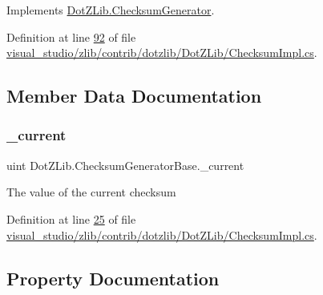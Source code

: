 Implements \hyperlink{interface_dot_z_lib_1_1_checksum_generator_ab894f35764ea30031c616517a6a00391}{Dot\+Z\+Lib.\+Checksum\+Generator}.



Definition at line \hyperlink{visual__studio_2zlib_2contrib_2dotzlib_2_dot_z_lib_2_checksum_impl_8cs_source_l00092}{92} of file \hyperlink{visual__studio_2zlib_2contrib_2dotzlib_2_dot_z_lib_2_checksum_impl_8cs_source}{visual\+\_\+studio/zlib/contrib/dotzlib/\+Dot\+Z\+Lib/\+Checksum\+Impl.\+cs}.



\subsection{Member Data Documentation}
\mbox{\label{class_dot_z_lib_1_1_checksum_generator_base_a081221e827dc7d3050fbdffc2973abea}} 
\subsubsection{\texorpdfstring{\+\_\+current}{\_current}}
{\footnotesize\ttfamily uint Dot\+Z\+Lib.\+Checksum\+Generator\+Base.\+\_\+current\hspace{0.3cm}{\ttfamily [protected]}}



The value of the current checksum 



Definition at line \hyperlink{visual__studio_2zlib_2contrib_2dotzlib_2_dot_z_lib_2_checksum_impl_8cs_source_l00025}{25} of file \hyperlink{visual__studio_2zlib_2contrib_2dotzlib_2_dot_z_lib_2_checksum_impl_8cs_source}{visual\+\_\+studio/zlib/contrib/dotzlib/\+Dot\+Z\+Lib/\+Checksum\+Impl.\+cs}.



\subsection{Property Documentation}
\mbox{\label{class_dot_z_lib_1_1_checksum_generator_base_aeaf336483beafb0c2af9285bf37db5fe}} 
